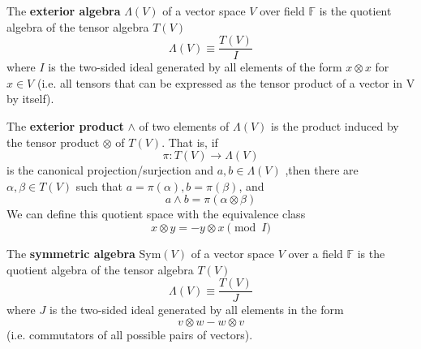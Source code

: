   \begin{definition}
    The \textbf{exterior algebra} $\Lambda(V)$ of a vector space $V$ over field $\mathbb{F}$ is the quotient algebra of the tensor algebra $T(V)$
    \begin{equation}
      \Lambda(V) \equiv \frac{T(V)}{I}
    \end{equation}
    where $I$ is the two-sided ideal generated by all elements of the form $x \otimes x$ for $x \in V$ (i.e. all tensors that can be expressed as the tensor product of a vector in V by itself). 

    The \textbf{exterior product} $\wedge$ of two elements of $\Lambda(V)$ is the product induced by the tensor product $\otimes$ of $T(V)$. That is, if 
    \begin{equation}
      \pi: T(V) \longrightarrow \Lambda(V)
    \end{equation}
    is the canonical projection/surjection and $a, b \in \Lambda(V)$ ,then there are $\alpha, \beta \in T(V)$ such that $a = \pi(\alpha), b = \pi(\beta)$, and 
    \begin{equation}
      a \wedge b = \pi(\alpha \otimes \beta)
    \end{equation}
    We can define this quotient space with the equivalence class
    \begin{equation}
      x \otimes y = - y \otimes x \pmod{I}
    \end{equation}
  \end{definition}

  \begin{definition}
    The \textbf{symmetric algebra} Sym$(V)$ of a vector space $V$ over a field $\mathbb{F}$ is the quotient algebra of the tensor algebra $T(V)$ 
    \begin{equation}
      \Lambda(V) \equiv \frac{T(V)}{J}
    \end{equation}
    where $J$ is the two-sided ideal generated by all elements in the form 
    \begin{equation}
      v \otimes w - w \otimes v
    \end{equation}
    (i.e. commutators of all possible pairs of vectors). 
  \end{definition}

